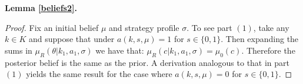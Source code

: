 \documentclass[11pt,]{article}
\begin{document}
\noindent\textbf{Lemma \ref{beliefs2}.}
\begin{proof}Fix an initial belief $\mu$ and strategy profile $\sigma$. To see part $(1)$, take any $k\in K$ and suppose that under $a(k,s,\mu)=1$ for $s\in\{0,1\}$.  Then expanding the sums in $\mu_R(\theta|k_1,a_1,\sigma)$ we have that: $\mu_R(c|k_1,a_1,\sigma)=\mu_0(c)$.  Therefore the posterior belief is the same as the prior.  A derivation analogous to that in part $(1)$ yields the same result for the case where $a(k,s,\mu)=0$ for $s\in\{0,1\}$.
\end{proof}
\end{document}
